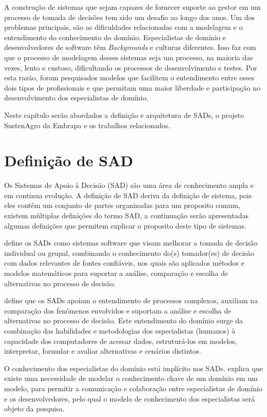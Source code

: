 A construção de sistemas que sejam capazes de fornecer suporte ao
gestor em um processo de tomada de decisões tem sido um desafio ao
longo dos anos. Um dos problemas principais, são as dificuldades relacionadas
com a modelagem e o entendimento do conhecimento do domínio. Especialistas
de domínio e desenvolvedores de software têm \foreignlanguage{english}{\emph{Backgrounds}}
e culturas diferentes. Isso faz com que o processo de modelagem desses
sistemas seja um processo, na maioria das vezes, lento e custoso,
dificultando os processos de desenvolvimento e testes. Por esta razão,
foram pesquisados modelos que facilitem o entendimento entre esses
dois tipos de profissionais e que permitam uma maior liberdade e participação
no desenvolvimento dos especialistas de domínio.

Neste capítulo serão abordados a definição e arquitetura de SADs,
o projeto SustenAgro da Embrapa e os trabalhos relacionados.

\section{Definição de SAD}

Os Sistemas de Apoio à Decisão (SAD) são uma área de conhecimento
ampla e em continua evolução. A definição de SAD deriva da definição
de sistema, pois eles contêm um conjunto de partes organizadas para
um proposito comum, existem múltiplas definições do termo SAD, a continuação
serão apresentadas algumas definições que permitem explicar o proposito
deste tipo de sistemas.

\citet{Tweedale2016} define os SADs como sistemas software que visam
melhorar a tomada de decisão individual ou grupal, combinando o conhecimento
do(s) tomador(es) de decisão com dados relevantes de fontes confiáveis,
nos quais são aplicados métodos e modelos matemáticos para suportar
a análise, comparação e escolha de alternativas no processo de decisão.

\citet{heinzle2010semantica} define que os SADs apoiam o entendimento
de processos complexos, auxiliam na comparação dos fenômenos envolvidos
e suportam a análise e escolha de alternativas no processo de decisão.
Este entendimento do domínio surge da combinação das habilidades e
metodologias dos especialistas (humanos) à capacidade dos computadores
de acessar dados, estruturá-los em modelos, interpretar, formular
e avaliar alternativas e cenários distintos.

O conhecimento dos especialistas do domínio está implícito nos SADs.
\citet{Evans:2003:DDT:861502} explica que existe uma necessidade
de modelar o conhecimento chave de um domínio em um modelo, para permitir
a comunicação e colaboração entre especialistas de domínio e os desenvolvedores,
pelo qual o modelo de conhecimento dos especialistas será objeto da
pesquisa. 

